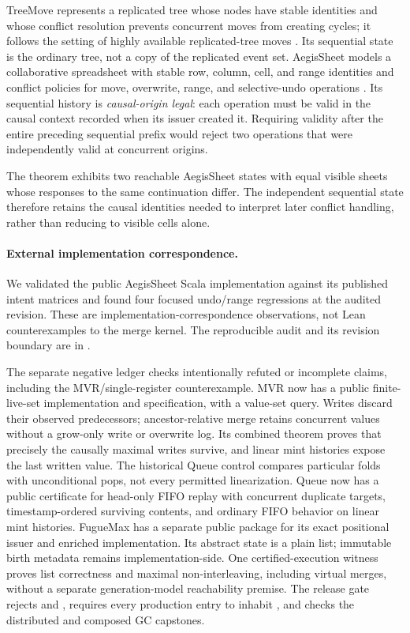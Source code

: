 TreeMove represents a replicated tree whose nodes have stable identities and
whose conflict resolution prevents concurrent moves from creating cycles; it
follows the setting of highly available replicated-tree moves
\cite{kleppmann2022treemove}. Its sequential state is the ordinary tree, not a
copy of the replicated event set. AegisSheet models a collaborative spreadsheet
with stable row, column, cell, and range identities and conflict policies for
move, overwrite, range, and selective-undo operations
\cite{pfeil2026aegissheet}. Its sequential history is \emph{causal-origin
legal}: each operation must be valid in the causal context recorded when its
issuer created it. Requiring validity after the entire preceding sequential
prefix would reject two operations that were independently valid at
concurrent origins.

The theorem  exhibits two reachable AegisSheet
states with equal visible sheets whose responses to the same continuation
differ. The independent sequential state therefore retains the causal
identities needed to interpret later conflict handling, rather than reducing
to visible cells alone.

\paragraph{External implementation correspondence.}
We validated the public AegisSheet Scala implementation against its published
intent matrices and found four focused undo/range regressions at the audited
revision. These are implementation-correspondence observations, not Lean
counterexamples to the merge kernel. The reproducible audit and its revision
boundary are in .

The separate negative ledger checks intentionally refuted or incomplete
claims, including the MVR/single-register counterexample. MVR now has a public
finite-live-set implementation and specification, with a value-set query.
Writes discard their observed predecessors; ancestor-relative merge retains
concurrent values without a grow-only write or overwrite log. Its combined theorem
proves that precisely the causally maximal writes survive, and linear mint
histories expose the last written value. The historical Queue
control compares particular folds with unconditional pops, not every permitted
linearization. Queue now has a public certificate for head-only FIFO replay
with concurrent duplicate targets, timestamp-ordered surviving contents, and
ordinary FIFO behavior on linear mint histories.
FugueMax has a separate public package for its exact positional issuer and
enriched implementation. Its abstract state is a plain list; immutable birth
metadata remains implementation-side. One certified-execution witness proves
list correctness and maximal non-interleaving, including virtual merges,
without a separate generation-model reachability premise. The
release gate rejects  and , requires every
production entry to inhabit , and checks the distributed
and composed GC capstones.

